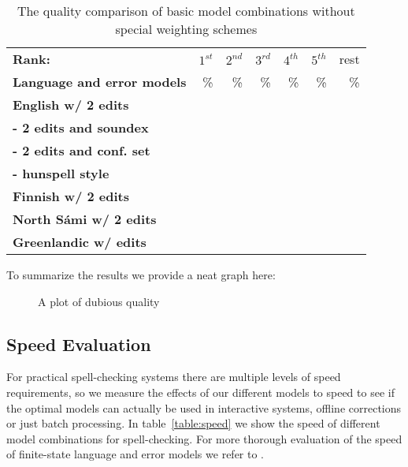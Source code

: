 \documentclass[a4paper,12pt]{article}
\begin{document}
\begin{table}
    \centering
    \begin{tabular}{|l|r|r|r|r|r|r|}
        \hline
        \bf Rank: & $1^{st}$ & $2^{nd}$ & $3^{rd}$ & $4^{th}$ & $5^{th}$ & rest \\
        \bf Language and error models &  \% & \% & \% & \% & \% & \% \\
        \hline
        \bf English w/ 2 edits & & & & & & \\
     \bf - 2 edits and soundex & & & & & & \\
   \bf - 2 edits and conf. set & & & & & & \\
          \bf - hunspell style & & & & & & \\
        \hline
        \bf Finnish w/ 2 edits & & & & & \\
        \hline
        \bf North Sámi w/ 2 edits & & & & & \\
        \hline
        \bf Greenlandic w/ edits & & & & & \\
        \hline
    \end{tabular}
    \caption{The quality comparison of basic model combinations without special
    weighting schemes\label{table:commercial-quality}}
\end{table}

To summarize the results we provide a neat graph here:

\begin{figure}
    \centering
    \caption{A plot of dubious quality
    \label{fig:quality}}
\end{figure}


\subsection{Speed Evaluation}

For practical spell-checking systems there are multiple levels of speed
requirements, so we measure the effects of our different models to speed to
see if the optimal models can actually be used in interactive systems, offline
corrections or just batch processing. In table~\ref{table:speed} we show the
speed of different model combinations for spell-checking. For more thorough
evaluation of the speed of finite-state language and error models we refer to
\cite{pirinen2012improving}.
\end{document}
